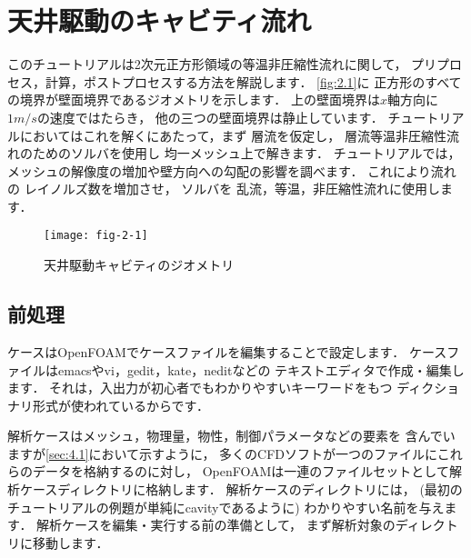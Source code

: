 \section{天井駆動のキャビティ流れ}
\label{sec:2.1}
%
%
%
このチュートリアルは2次元正方形領域の等温非圧縮性流れに関して，
プリプロセス，計算，ポストプロセスする方法を解説します．
\autoref{fig:2.1}に
正方形のすべての境界が壁面境界であるジオメトリを示します．
上の壁面境界は$x$軸方向に$1\unit{m/s}$の速度ではたらき，
他の三つの壁面境界は静止しています．
チュートリアルにおいてはこれを解くにあたって，まず
%
層流を仮定し，
層流等温非圧縮性流れのためのソルバを使用し
均一メッシュ上で解きます．
チュートリアルでは，
メッシュの解像度の増加や壁方向への勾配の影響を調べます．
これにより流れの
%
レイノルズ数を増加させ，
%
%
ソルバを
%
乱流，等温，非圧縮性流れに使用します．


\begin{figure}[ht]
 \texttt{[image: fig-2-1]}
 \caption{天井駆動キャビティのジオメトリ}
 \label{fig:2.1}
\end{figure}


\subsection{前処理}
\label{ssec:2.1.1}
ケースはOpenFOAMでケースファイルを編集することで設定します．
ケースファイルはemacsやvi，gedit，kate，neditなどの
テキストエディタで作成・編集します．
それは，入出力が初心者でもわかりやすいキーワードをもつ
ディクショナリ形式が使われているからです．

解析ケースはメッシュ，物理量，物性，制御パラメータなどの要素を
含んでいますが\autoref{sec:4.1}において示すように，
多くのCFDソフトが一つのファイルにこれらのデータを格納するのに対し，
OpenFOAMは一連のファイルセットとして解析ケースディレクトリに格納します．
解析ケースのディレクトリには，
(最初のチュートリアルの例題が単純にcavityであるように)
わかりやすい名前を与えます．
解析ケースを編集・実行する前の準備として，
まず解析対象のディレクトリに移動します．

